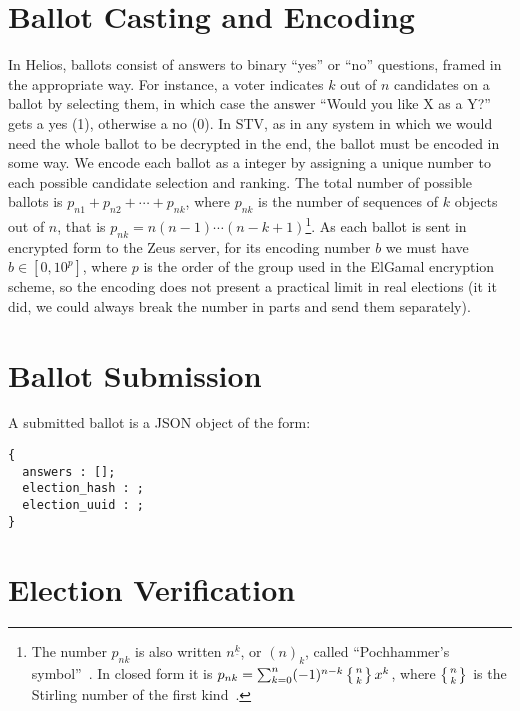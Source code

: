 \documentclass[runningheads,a4paper]{llncs}
\begin{document}
\section{Ballot Casting and Encoding}

In Helios, ballots consist of answers to binary ``yes'' or ``no''
questions, framed in the appropriate way. For instance, a voter
indicates $k$ out of $n$ candidates on a ballot by selecting them, in
which case the answer ``Would you like X as a Y?'' gets a yes (1),
otherwise a no (0). In STV, as in any system in which we would need
the whole ballot to be decrypted in the end, the ballot must be
encoded in some way. We encode each ballot as a integer by assigning a
unique number to each possible candidate selection and ranking. The
total number of possible ballots is $p _{n1} + p_{n2} + \cdots + p
_{nk}$, where $p_{nk}$ is the number of sequences of $k$ objects out
of $n$, that is $p_{nk} = n(n - 1)\cdots(n - k + 1)$\footnote{The
  number $p_{nk}$ is also written $n^{\underline{k}}$, or $(n)_k$,
  called ``Pochhammer's symbol''~\cite[p.\ 48]{graham:1994}. In closed
  form it is $p_{nk} = \sum_{k=0}^{n} (-1)^{n-k}\left\{n \atop
    k\right\}x^k$, where $\left\{n \atop k\right\}$ is the Stirling
  number of the first kind~\cite{weisstein:pochhammer}.}. As each
ballot is sent in encrypted form to the Zeus server, for its encoding
number $b$ we must have $b \in [0, 10^p]$, where $p$ is the order of
the group used in the ElGamal encryption scheme, so the encoding does
not present a practical limit in real elections (it it did, we could
always break the number in parts and send them separately).


\section{Ballot Submission}

A submitted ballot is a JSON object of the form:
\begin{verbatim}
{
  answers : [];
  election_hash : ;
  election_uuid : ;
} 
\end{verbatim}

\section{Election Verification}

\end{document}
